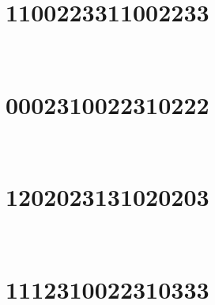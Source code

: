 \,
\newline
\vspace{1.2cm}

\section{1100223311002233}

\marginnote[3\baselineskip]{\centering}



\,
\newline
\vspace{1.2cm}

\section{0002310022310222}

\marginnote[3\baselineskip]{\centering}



\,
\newline
\vspace{1.2cm}

\section{1202023131020203}

\marginnote[3\baselineskip]{\centering}



\,
\newline
\vspace{1.2cm}

\section{1112310022310333}

\marginnote[3\baselineskip]{\centering}



\,
\newline
\vspace{1.2cm}

